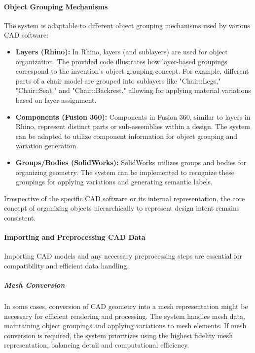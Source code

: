 \documentclass[12pt]{article}
\begin{document}
\paragraph{Object Grouping Mechanisms}

The system is adaptable to different object grouping mechanisms used by various CAD software:

\begin{itemize}
    \item \textbf{Layers (Rhino):} In Rhino, layers (and sublayers) are used for object organization. The provided code illustrates how layer-based groupings correspond to the invention's object grouping concept. For example, different parts of a chair model are grouped into sublayers like  "Chair::Legs," "Chair::Seat," and "Chair::Backrest," allowing for applying material variations based on layer assignment.

    \item \textbf{Components (Fusion 360):} Components in Fusion 360, similar to layers in Rhino, represent distinct parts or sub-assemblies within a design. The system can be adapted to utilize component information for object grouping and variation generation.

    \item \textbf{Groups/Bodies (SolidWorks):} SolidWorks utilizes groups and bodies for organizing geometry. The system can be implemented to recognize these groupings for applying variations and generating semantic labels.
\end{itemize}

Irrespective of the specific CAD software or its internal representation, the core concept of organizing objects hierarchically to represent design intent remains consistent.



\paragraph{Importing and Preprocessing CAD Data}
Importing CAD models and any necessary preprocessing steps are essential for compatibility and efficient data handling.

\subparagraph{Mesh Conversion}

In some cases, conversion of CAD geometry into a mesh representation might be necessary for efficient rendering and processing. The system handles mesh data, maintaining object groupings and applying variations to mesh elements. If mesh conversion is required, the system prioritizes using the highest fidelity mesh representation, balancing detail and computational efficiency.
\end{document}
